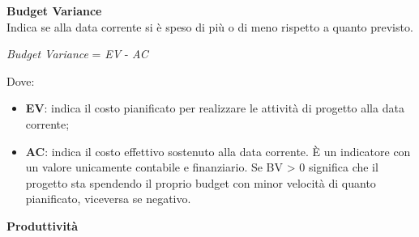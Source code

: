 \textbf{Budget Variance}\\

Indica se alla data corrente si \`e speso di pi\`u o di meno rispetto a quanto previsto.\\
\begin{center}
	\textit{Budget Variance} = \textit{EV} - \textit{AC}
\end{center}
Dove:
\begin{itemize}
	\item \textbf{EV}: indica il costo pianificato per realizzare le attivit\`a di progetto alla data corrente;
	\item \textbf{AC}: indica il costo effettivo sostenuto alla data corrente. \`E un indicatore con
un valore unicamente contabile e finanziario. Se BV > 0 significa che il progetto sta spendendo
il proprio budget con minor velocit\`a di quanto pianificato, viceversa se negativo.
\end{itemize}

\textbf{Produttivit\`a}\\

